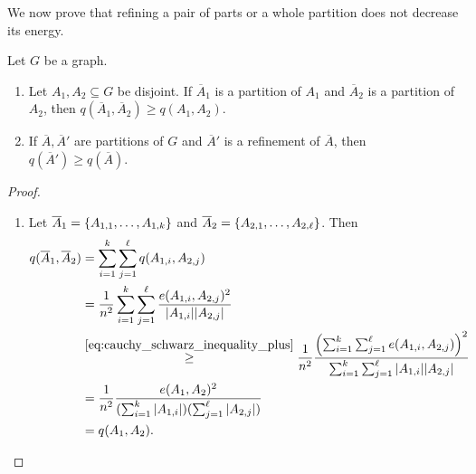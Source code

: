        We now prove that refining a pair of parts or a whole partition does not decrease its energy.
        \begin{lemma} \label{lem:energy_does_not_decrease_when_refining}
            Let $G$ be a graph.
            \begin{enumerate}[label={\Roman*}., ref={\Roman*}, font=\rmfamily]
                \item \label{lem:energy_does_not_decrease_when_refining.1} Let $A_1, A_2 \subseteq G$ be disjoint.
                    If $\overline{A}_1$ is a partition of $A_1$ and $\overline{A}_2$ is a partition of $A_2$, then
                    $q(\overline{A}_1, \overline{A}_2) \geq q(A_1, A_2)$.
                \item \label{lem:energy_does_not_decrease_when_refining.2} If $\overline{A}, \overline{A}'$ are
                    partitions of $G$ and $\overline{A}'$ is a refinement of $\overline{A}$, then
                    $q(\overline{A}') \geq q(\overline{A})$.
            \end{enumerate}
            \begin{proof}
                \begin{enumerate}[label={\Roman*}., ref={\Roman*}, font=\rmfamily]
                    \item
                        Let $\overline{A}_1 = \{ A_{1,1}, \dots, A_{1,k} \}$ and
                        $\overline{A}_2 = \{ A_{2,1}, \dots, A_{2,\ell} \}$.
                        Then
                        \begin{align*}
                            q(\overline{A}_1, \overline{A}_2)
                                & = \sum_{i=1}^k \sum_{j=1}^\ell q(A_{1,i}, A_{2,j}) \\
                                & = \frac{1}{n^2} \sum_{i=1}^k \sum_{j=1}^\ell \frac{e(A_{1,i}, A_{2,j})^2}{|A_{1,i}||A_{2,j}|} \\
                                & \stackrel{\eqref{eq:cauchy_schwarz_inequality_plus}}{\geq} \frac{1}{n^2}
                                    \frac{\left( \sum_{i=1}^k \sum_{j=1}^\ell e(A_{1,i}, A_{2,j}) \right)^2}
                                    {\sum_{i=1}^k \sum_{j=1}^\ell |A_{1,i}||A_{2,j}|} \\
                                & = \frac{1}{n^2} \frac{e(A_1, A_2)^2}
                                    {(\sum_{i=1}^k |A_{1,i}|)(\sum_{j=1}^\ell |A_{2,j}|)} \\
                                & = q(A_1, A_2).
                        \end{align*}

\end{enumerate}
\end{proof}
\end{lemma}
